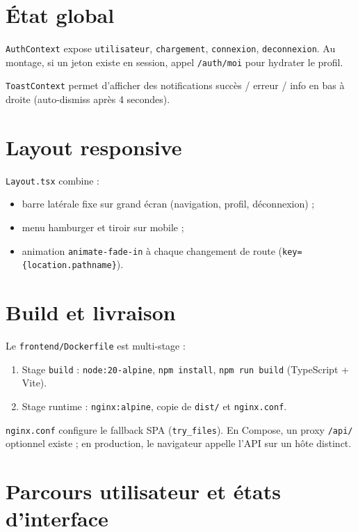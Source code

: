 \section{État global}

\texttt{AuthContext} expose \texttt{utilisateur}, \texttt{chargement}, \texttt{connexion}, \texttt{deconnexion}. Au montage, si un jeton existe en session, appel \texttt{/auth/moi} pour hydrater le profil.

\texttt{ToastContext} permet d'afficher des notifications succès / erreur / info en bas à droite (auto-dismiss après 4 secondes).

\section{Layout responsive}

\texttt{Layout.tsx} combine :
\begin{itemize}
  \item barre latérale fixe sur grand écran (navigation, profil, déconnexion) ;
  \item menu hamburger et tiroir sur mobile ;
  \item animation \texttt{animate-fade-in} à chaque changement de route (\texttt{key=\{location.pathname\}}).
\end{itemize}

\section{Build et livraison}

Le \texttt{frontend/Dockerfile} est multi-stage :
\begin{enumerate}
  \item Stage \texttt{build} : \texttt{node:20-alpine}, \texttt{npm install}, \texttt{npm run build} (TypeScript + Vite).
  \item Stage runtime : \texttt{nginx:alpine}, copie de \texttt{dist/} et \texttt{nginx.conf}.
\end{enumerate}

\texttt{nginx.conf} configure le fallback SPA (\texttt{try\_files}). En Compose, un proxy \texttt{/api/} optionnel existe ; en production, le navigateur appelle l'API sur un hôte distinct.

\section{Parcours utilisateur et états d'interface}

